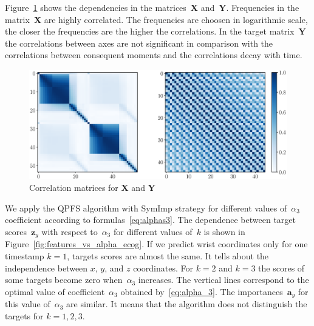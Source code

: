 \documentclass[12pt,oneside]{article}
\theoremstyle{definition}
\newcommand{\ba}{\mathbf{a}}
\newcommand{\bz}{\mathbf{z}}
\newcommand{\bY}{\mathbf{Y}}
\newcommand{\bX}{\mathbf{X}}
\begin{document}
Figure~\ref{fig:corr_matrix} shows the dependencies in the matrices~$\bX$ and~$\bY$. Frequencies in the matrix~$\bX$ are highly correlated. 
The frequencies are choosen in logarithmic scale, the closer the frequencies are the higher the correlations.
In the target matrix~$\bY$ the correlations between axes are not significant in comparison with the correlations between consequent moments and the correlations decay with time.
\begin{figure}[h]
	\includegraphics[width=\linewidth]{figs/corr_matrix.eps}
	\caption{Correlation matrices for $\bX$ and $\bY$}
	\label{fig:corr_matrix}
\end{figure}

We apply the QPFS algorithm with SymImp strategy for different values of~$\alpha_3$ coefficient according to formulas~\eqref{eq:alphas3}.
The dependence between target scores~$\bz_y$ with respect to~$\alpha_3$ for different values of~$k$ is shown in Figure~\ref{fig:features_vs_alpha_ecog}.
If we predict wrist coordinates only for one timestamp $k = 1$, targets scores are almost the same.
It tells about the independence between $x$, $y$, and $z$ coordinates.
For $k = 2$ and $k = 3$ the scores of some targets become zero when~$\alpha_3$ increases.
The vertical lines correspond to the optimal value of coefficient~$\alpha_3$ obtained by~\eqref{eq:alpha_3}. 
The importances~$\ba_y$ for this value of~$\alpha_3$ are similar. 
It means that the algorithm does not distinguish the targets for $k=1, 2, 3$.
\end{document}
